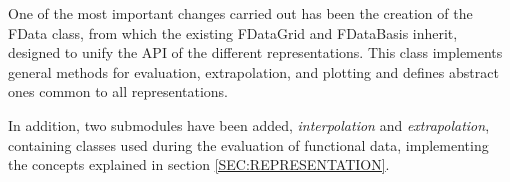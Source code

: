 One of the most important changes carried out has been the creation of the
FData class, from which the existing FDataGrid and FDataBasis inherit,
designed to unify the API of the different representations. This class
implements general methods for evaluation, extrapolation, and plotting and
defines abstract ones common to all representations.

In addition, two submodules have been added,
\textit{interpolation} and \textit{extrapolation}, containing classes used during the
evaluation of functional data, implementing the concepts explained
in section \ref{SEC:REPRESENTATION}.
